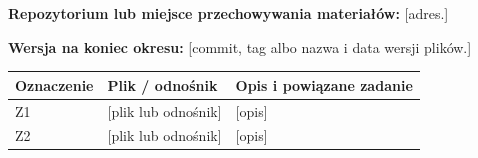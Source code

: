 \documentclass[11pt,a4paper,oneside]{article}
\newcommand{\pole}[1]{\textnormal{[#1]}}
\begin{document}
\textbf{Repozytorium lub miejsce przechowywania materiałów:}
\pole{adres.}\par

\textbf{Wersja na koniec okresu:}
\pole{commit, tag albo nazwa i data wersji plików.}\par
\begin{tabularx}{\textwidth}{@{}p{} Y Y@{}}
\toprule
Oznaczenie & Plik / odnośnik & Opis i powiązane zadanie\\
\midrule
Z1 & \pole{plik lub odnośnik} & \pole{opis}\\
Z2 & \pole{plik lub odnośnik} & \pole{opis}\\
\bottomrule
\end{tabularx}
\end{document}
